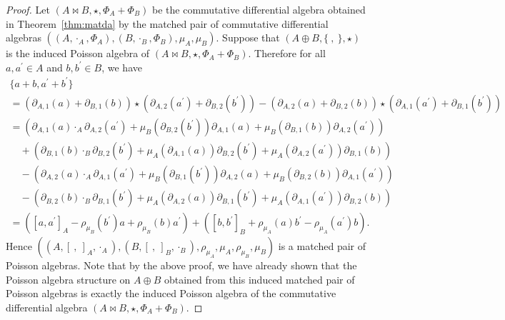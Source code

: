 \documentclass[pdftex]{sigma}
\numberwithin{equation}{section}
\begin{document}
\begin{proof}
 Let $(A \bowtie B, \star, \Phi_A + \Phi_B)$ be the commutative differential algebra obtained in Theorem~\ref{thm:matda} by the matched pair of commutative differential algebras $((A, \cdot_A, \Phi_A), (B, \cdot_B, \Phi_B), \mu_A, \allowbreak \mu_B)$.
 Suppose that $(A \oplus B, \{\ ,\ \}, \star)$ is the induced Poisson algebra of $(A \bowtie B, \star, \Phi_A + \Phi_B)$.
 Therefore for all $a, a^\prime \in A$ and $b, b^\prime \in B$, we have
 \begin{gather*}
 \{a + b, a^\prime + b^\prime\} \\
 = (\partial_{A,1}(a)+\partial_{B,1}(b)) \star (\partial_{A,2}(a^\prime)+\partial_{B,2}(b^\prime)) - (\partial_{A,2}(a)+\partial_{B,2}(b)) \star (\partial_{A,1}(a^\prime)+\partial_{B,1}(b^\prime)) \\
 = (\partial_{A,1}(a) \cdot_A \partial_{A,2}(a^\prime) + \mu_B(\partial_{B,2}(b^\prime))\partial_{A,1}(a) + \mu_B(\partial_{B,1}(b))\partial_{A,2}(a^\prime)) \\
 \quad + (\partial_{B,1}(b) \cdot_B \partial_{B,2}(b^\prime) + \mu_A(\partial_{A,1}(a))\partial_{B,2}(b^\prime) + \mu_A(\partial_{A,2}(a^\prime))\partial_{B,1}(b)) \\
 \quad - (\partial_{A,2}(a) \cdot_A \partial_{A,1}(a^\prime) + \mu_B(\partial_{B,1}(b^\prime))\partial_{A,2}(a) + \mu_B(\partial_{B,2}(b))\partial_{A,1}(a^\prime)) \\
 \quad - (\partial_{B,2}(b) \cdot_B \partial_{B,1}(b^\prime) + \mu_A(\partial_{A,2}(a))\partial_{B,1}(b^\prime) + \mu_A(\partial_{A,1}(a^\prime))\partial_{B,2}(b)) \\
 = ([a, a^\prime]_A - \rho_{\mu_B}(b^\prime)a + \rho_{\mu_B}(b)a^\prime) + ([b, b^\prime]_B + \rho_{\mu_A}(a)b^\prime - \rho_{\mu_A}(a^\prime)b).
 \end{gather*}
 Hence $((A, [\ ,\ ]_A, \cdot_A), (B, [\ ,\ ]_B, \cdot_B), \rho_{\mu_A}, \mu_A, \rho_{\mu_B}, \mu_B)$ is a matched pair of Poisson algebras.
 Note that by the above proof, we have already shown that the Poisson algebra structure on $A\oplus B$ obtained from this induced matched pair of
 Poisson algebras is exactly the induced Poisson algebra of the
 commutative differential algebra $(A \bowtie B, \star, \Phi_A + \Phi_B)$.
\end{proof}
\end{document}
